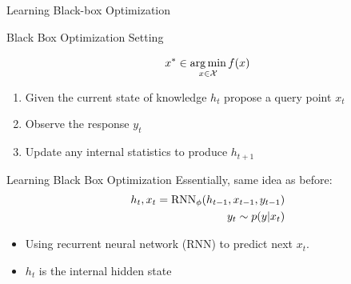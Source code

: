 \begin{frame}[c]{Learning Black-box Optimization~}

\begin{block}{Black Box Optimization Setting}

\begin{equation}
x^* \in \operatorname*{arg\,min}_{x \in \mathcal{X}} f(x) \nonumber
\end{equation}
	
\begin{enumerate}
\item Given the current state of knowledge $h_t$ propose a query point $x_t$
\item Observe the response $y_t$
\item Update any internal statistics to produce $h_{t+1}$
\end{enumerate}
\end{block}

\pause

\begin{block}{Learning Black Box Optimization}
Essentially, same idea as before:
\begin{eqnarray}
h_t, x_t = \text{RNN}_\phi(h_{t-1}, x_{t-1}, y_{t-1}) \nonumber \\
y_t \sim p(y|x_t)\nonumber
\end{eqnarray}

\begin{itemize}
\item Using recurrent neural network (RNN) to predict next $x_t$.
\item $h_t$ is the internal hidden state 
\end{itemize}

\end{block}



\end{frame}
